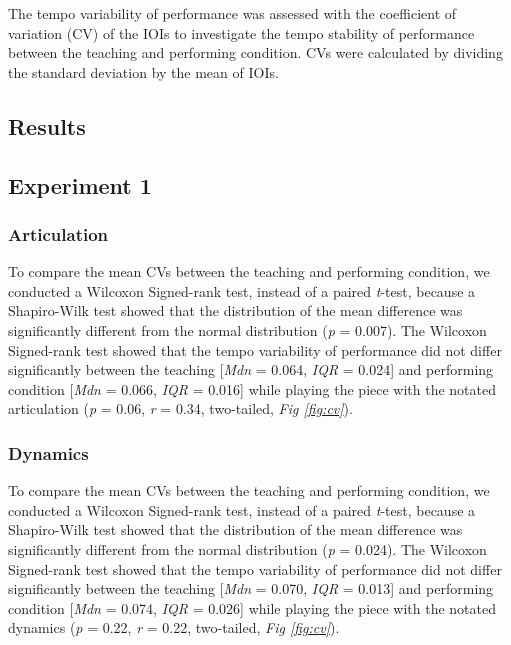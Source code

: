 \documentclass[
  man,floatsintext]{apa6}
\begin{document}
The tempo variability of performance was assessed with the coefficient of variation (CV) of the IOIs to investigate the tempo stability of performance between the teaching and performing condition. CVs were calculated by dividing the standard deviation by the mean of IOIs.

\hypertarget{results-2}{%
\subsection{Results}\label{results-2}}

\hypertarget{experiment-1-3}{%
\subsection{Experiment 1}\label{experiment-1-3}}

\hypertarget{articulation-2}{%
\subsubsection{Articulation}\label{articulation-2}}

To compare the mean CVs between the teaching and performing condition, we conducted a Wilcoxon Signed-rank test, instead of a paired \emph{t}-test, because a Shapiro-Wilk test showed that the distribution of the mean difference was significantly different from the normal distribution (\emph{p} = 0.007). The Wilcoxon Signed-rank test showed that the tempo variability of performance did not differ significantly between the teaching {[}\emph{Mdn} = 0.064, \emph{IQR} = 0.024{]} and performing condition {[}\emph{Mdn} = 0.066, \emph{IQR} = 0.016{]} while playing the piece with the notated articulation (\emph{p} = 0.06, \emph{r} = 0.34, two-tailed, \emph{Fig \ref{fig:cv}}).

\hypertarget{dynamics-2}{%
\subsubsection{Dynamics}\label{dynamics-2}}

To compare the mean CVs between the teaching and performing condition, we conducted a Wilcoxon Signed-rank test, instead of a paired \emph{t}-test, because a Shapiro-Wilk test showed that the distribution of the mean difference was significantly different from the normal distribution (\emph{p} = 0.024). The Wilcoxon Signed-rank test showed that the tempo variability of performance did not differ significantly between the teaching {[}\emph{Mdn} = 0.070, \emph{IQR} = 0.013{]} and performing condition {[}\emph{Mdn} = 0.074, \emph{IQR} = 0.026{]} while playing the piece with the notated dynamics (\emph{p} = 0.22, \emph{r} = 0.22, two-tailed, \emph{Fig \ref{fig:cv}}).
\end{document}
